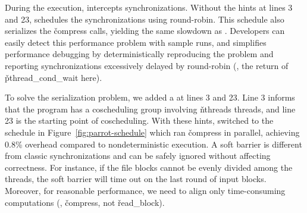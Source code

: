
\noindent
During the execution, \parrot intercepts \pthread synchronizations.  Without
the hints at lines 3 and 23, \parrot schedules the synchronizations using round-robin. 
This schedule also serializes the \v{compress} calls, yielding the same slowdown as \dthreads.
Developers can easily detect this performance problem with
sample runs, and \parrot simplifies performance debugging by
deterministically reproducing the problem and reporting synchronizations
excessively delayed  by round-robin
(\eg, the return of \v{pthread\_cond\_wait} here).

To solve the serialization problem, we added a \compute at lines 3 and 23.  Line 3
informs \parrot that the program has a coscheduling group involving
\v{nthreads} threads, and line 23 is the starting point of coscheduling.  With
these hints, \parrot switched to the schedule in
Figure~\ref{fig:parrot-schedule} which ran \v{compress} in parallel,
achieving 0.8\% overhead compared to nondeterministic execution. A soft barrier is
different from classic synchronizations and can be safely 
ignored without affecting correctness.  For
instance, if the file blocks cannot be evenly divided among
the threads, the soft barrier will time out on the last round of input blocks.  Moreover,
for reasonable performance, we need to align only time-consuming computations
(\eg, \v{compress}, not \v{read\_block}).



